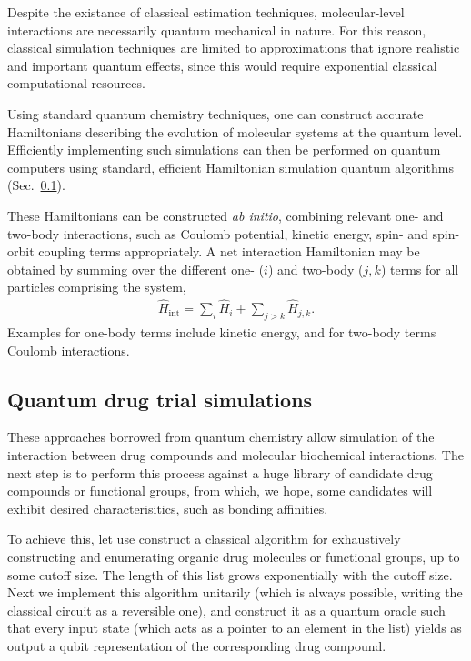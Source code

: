 Despite the existance of classical estimation techniques, molecular-level interactions are necessarily quantum mechanical in nature. For this reason, classical simulation techniques are limited to approximations that ignore realistic and important quantum effects, since this would require exponential classical computational resources.

Using standard quantum chemistry techniques, one can construct accurate Hamiltonians describing the evolution of molecular systems at the quantum level. Efficiently implementing such simulations can then be performed on quantum computers using standard, efficient Hamiltonian simulation quantum algorithms (Sec.~\ref{}).

These Hamiltonians can be constructed \textit{ab initio}, combining relevant one- and two-body interactions, such as Coulomb potential, kinetic energy, spin- and spin-orbit coupling terms appropriately. A net interaction Hamiltonian may be obtained by summing over the different one- ($i$) and two-body (\mbox{$j,k$}) terms for all particles comprising the system,
\begin{align}
	\hat{H}_\mathrm{int} = \sum_i \hat{H}_i + \sum_{j>k} \hat{H}_{j,k}.
\end{align}
Examples for one-body terms include kinetic energy, and for two-body terms Coulomb interactions.

%
%

\subsection{Quantum drug trial simulations}

These approaches borrowed from quantum chemistry allow simulation of the interaction between drug compounds and molecular biochemical interactions. The next step is to perform this process against a huge library of candidate drug compounds or functional groups, from which, we hope, some candidates will exhibit desired characterisitics, such as bonding affinities.

To achieve this, let use construct a classical algorithm for exhaustively constructing and enumerating organic drug molecules or functional groups, up to some cutoff size. The length of this list grows exponentially with the cutoff size. Next we implement this algorithm unitarily (which is always possible, writing the classical circuit as a reversible one), and construct it as a quantum oracle such that every input state (which acts as a pointer to an element in the list) yields as output a qubit representation of the corresponding drug compound.


